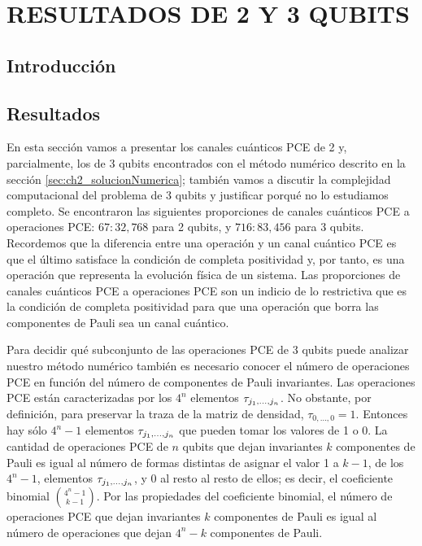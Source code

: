 \chapter{RESULTADOS DE 2 Y 3 QUBITS}
\section{Introducción}

\section{Resultados}
En esta sección vamos a presentar los canales cuánticos PCE de 2 y,
parcialmente, los de 3 qubits 
encontrados con el método numérico descrito en la sección 
\ref{sec:ch2_solucionNumerica}; también vamos a discutir la complejidad 
computacional del problema de 3 qubits y justificar porqué no lo estudiamos completo.
Se encontraron las siguientes proporciones de canales cuánticos PCE a 
operaciones PCE: $67:32,768$ para 2 qubits, y $716:83,456$ para 
3 qubits. Recordemos que la diferencia entre una operación y un canal cuántico PCE
es que el último satisface la condición de completa positividad y, por tanto, 
es una operación que representa la evolución física de un sistema. 
Las proporciones de canales cuánticos PCE a operaciones PCE son un indicio 
de lo restrictiva que es la condición de completa positividad para que 
una operación que borra las componentes de Pauli sea un canal cuántico.

Para decidir qué subconjunto de las operaciones PCE de 3 qubits puede analizar
nuestro método numérico también es necesario conocer el número 
de operaciones PCE en función del número de componentes 
de Pauli invariantes. Las operaciones PCE están caracterizadas 
por los $4^n$ elementos $\tau_{j_1,\ldots ,j_n}$. No obstante, por definición, 
para preservar la traza de la matriz de densidad, $\tau_{0,\ldots,0}=1$.
Entonces hay sólo $4^n-1$ elementos $\tau_{j_1,\ldots ,j_n}$ que pueden tomar los valores de 1 o 0.
La cantidad de operaciones PCE de $n$ qubits que dejan invariantes $k$ componentes 
de Pauli es igual al número de formas distintas de asignar el valor 1
a $k-1$, de los $4^n-1$, elementos $\tau_{j_1,\ldots ,j_n}$, y 0 al resto al resto de ellos; 
es decir, el coeficiente binomial $\binom{4^n-1}{k-1}$. Por las propiedades
del coeficiente binomial, el número de operaciones PCE que dejan invariantes 
$k$ componentes de Pauli es igual al número de operaciones que dejan $4^n-k$
componentes de Pauli. 

